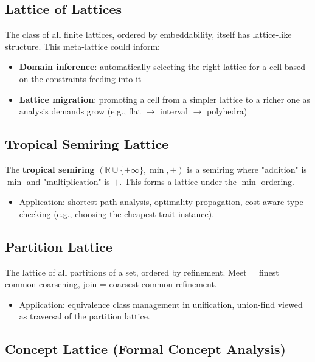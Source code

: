 \documentclass[11pt]{article}
\begin{document}
\subsection{Lattice of Lattices}
\label{sec:org5be9bc8}

The class of all finite lattices, ordered by embeddability, itself has lattice-like
structure. This meta-lattice could inform:

\begin{itemize}
\item \textbf{Domain inference}: automatically selecting the right lattice for a cell based
on the constraints feeding into it
\item \textbf{Lattice migration}: promoting a cell from a simpler lattice to a richer one
as analysis demands grow (e.g., flat \(\to\) interval \(\to\) polyhedra)
\end{itemize}
\subsection{Tropical Semiring Lattice}
\label{sec:org105c32e}

The \textbf{tropical semiring} \((\mathbb{R} \cup \{+\infty\}, \min, +)\) is a semiring
where "addition" is \(\min\) and "multiplication" is \(+\). This forms a lattice
under the \(\min\) ordering.

\begin{itemize}
\item Application: shortest-path analysis, optimality propagation, cost-aware type
checking (e.g., choosing the cheapest trait instance).
\end{itemize}
\subsection{Partition Lattice}
\label{sec:orge78abef}

The lattice of all partitions of a set, ordered by refinement. Meet = finest
common coarsening, join = coarsest common refinement.

\begin{itemize}
\item Application: equivalence class management in unification, union-find viewed
as traversal of the partition lattice.
\end{itemize}
\subsection{Concept Lattice (Formal Concept Analysis)}
\label{sec:orgb22669e}
\end{document}
